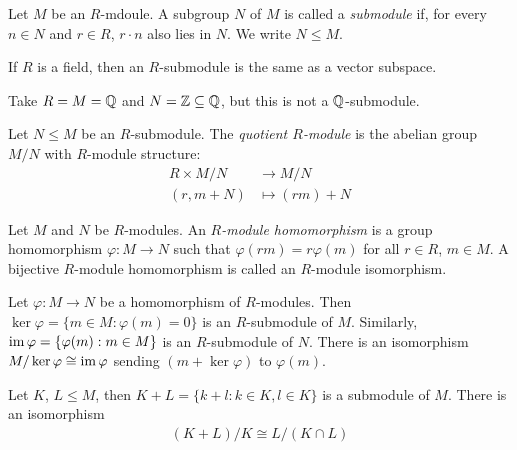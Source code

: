\documentclass{../template/note}
\begin{document}
    \begin{definition}[Submodules]
        Let $M$ be an $R$-mdoule. A subgroup $N$ of $M$ is called a \emph{submodule} if, for every $n \in N$ and $r \in R$, $r \cdot n$ also lies in $N$. We write $N \leq M$.
    \end{definition}

    \begin{remark*}
        If $R$ is a field, then an $R$-submodule is the same as a vector subspace.
    \end{remark*}    
    
    \begin{example*}
        Take $R = M = \mathbb Q$ and $N = \mathbb Z \subseteq \mathbb Q$, but this is not a $\mathbb Q$-submodule.
    \end{example*}
    
    \begin{definition}
        Let $N \leq M$ be an $R$-submodule. The \emph{quotient $R$-module} is the abelian group $M/N$ with $R$-module structure:
        \begin{align*}
            R \times M/N &\to M/N \\
            (r, m + N) &\mapsto (rm) + N
        \end{align*}
    \end{definition}
    
    \begin{definition}
        Let $M$ and $N$ be $R$-modules. An \emph{$R$-module homomorphism} is a group homomorphism $\varphi: M \to N$ such that $\varphi(rm) = r\varphi(m)$ for all $r \in R$, $m \in M$. A bijective $R$-module homomorphism is called an $R$-module isomorphism.
    \end{definition}
    
    \begin{theorem}
        Let $\varphi: M \to N$ be a homomorphism of $R$-modules. Then $\ker\varphi = \{m \in M: \varphi(m) = 0\}$ is an $R$-submodule of $M$. Similarly, $\operatorname{im}\varphi = \{\varphi(m): m \in M\}$ is an $R$-submodule of $N$. There is an isomorphism $M/\ker\varphi \cong \operatorname{im}\varphi$ sending $(m+\ker\varphi)$ to $\varphi(m)$.
    \end{theorem}
    
    \begin{theorem}
        Let $K$, $L \leq M$, then $K+L=\{k+l: k \in K, l \in K\}$ is a submodule of $M$. There is an isomorphism
        \begin{align*}
            (K+L)/K \cong L/(K \cap L)
        \end{align*}
    \end{theorem}
    
\end{document}
